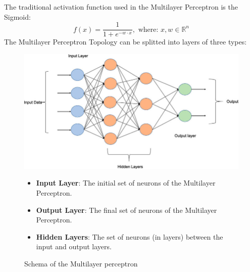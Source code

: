 \documentclass[a4paper, 11pt]{article}
\begin{document}
The traditional activation function used in the Multilayer Perceptron is the Sigmoid: 
$$f(x) = \frac{1}{1+e^{-w\cdot x}},\text{ where: } x,w\in\mathbb{R}^n$$
The Multilayer Perceptron Topology can be splitted into layers of three types:
\begin{figure}[h]
    \begin{minipage}{9cm}
        \includegraphics[width = 1 \textwidth]{Neural_Network/Multi-layer-perceptron-MLP-NN-basic-Architecture.png}
        \caption{Schema of the Multilayer perceptron}
    \end{minipage}
    \hspace{1em}
    \begin{minipage}{5cm}
        \begin{itemize}
            \item \textbf{Input Layer}: The initial set of neurons of the Multilayer Perceptron.
            \item \textbf{Output Layer}: The final set of neurons of the Multilayer Perceptron.
            \item \textbf{Hidden Layers}: The set of neurons (in layers) between the input and output layers.
        \end{itemize}
    \end{minipage}
\end{figure}\\
\newpage






\end{document}
